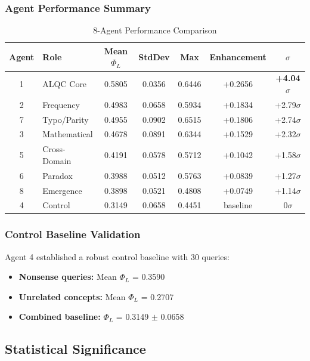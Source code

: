 \subsubsection{Agent Performance Summary}

\begin{table}[h]
\centering
\caption{8-Agent Performance Comparison}
\begin{tabular}{|c|l|c|c|c|c|c|}
\hline
\textbf{Agent} & \textbf{Role} & \textbf{Mean $\Phi_L$} & \textbf{StdDev} & \textbf{Max} & \textbf{Enhancement} & \textbf{$\sigma$} \\
\hline
1 & ALQC Core & 0.5805 & 0.0356 & 0.6446 & +0.2656 & \textbf{+4.04$\sigma$} \\
2 & Frequency & 0.4983 & 0.0658 & 0.5934 & +0.1834 & +2.79$\sigma$ \\
7 & Typo/Parity & 0.4955 & 0.0902 & 0.6515 & +0.1806 & +2.74$\sigma$ \\
3 & Mathematical & 0.4678 & 0.0891 & 0.6344 & +0.1529 & +2.32$\sigma$ \\
5 & Cross-Domain & 0.4191 & 0.0578 & 0.5712 & +0.1042 & +1.58$\sigma$ \\
6 & Paradox & 0.3988 & 0.0512 & 0.5763 & +0.0839 & +1.27$\sigma$ \\
8 & Emergence & 0.3898 & 0.0521 & 0.4808 & +0.0749 & +1.14$\sigma$ \\
4 & Control & 0.3149 & 0.0658 & 0.4451 & baseline & 0$\sigma$ \\
\hline
\end{tabular}
\end{table}

\subsubsection{Control Baseline Validation}

Agent 4 established a robust control baseline with 30 queries:

\begin{itemize}
\item \textbf{Nonsense queries:} Mean $\Phi_L$ = 0.3590
\item \textbf{Unrelated concepts:} Mean $\Phi_L$ = 0.2707
\item \textbf{Combined baseline:} $\Phi_L$ = 0.3149 $\pm$ 0.0658
\end{itemize}

\subsection{Statistical Significance}

